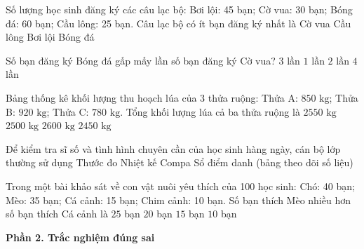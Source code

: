 \begin{ex} %
Số lượng học sinh đăng ký các câu lạc bộ: Bơi lội: 45 bạn; Cờ vua: 30 bạn; Bóng đá: 60 bạn; Cầu lông: 25 bạn. Câu lạc bộ có ít bạn đăng ký nhất là
\choice
{Cờ vua}
{\True Cầu lông}
{Bơi lội}
{Bóng đá}
\end{ex}

\begin{ex} %
Số bạn đăng ký Bóng đá gấp mấy lần số bạn đăng ký Cờ vua?
\choice
{$3$ lần}
{$1$ lần}
{\True $2$ lần}
{$4$ lần}
\end{ex}

\begin{ex} %
Bảng thống kê khối lượng thu hoạch lúa của 3 thửa ruộng: Thửa A: $850\text{ kg}$; Thửa B: $920\text{ kg}$; Thửa C: $780\text{ kg}$. Tổng khối lượng lúa cả ba thửa ruộng là
\choice
{\True $2550\text{ kg}$}
{$2500\text{ kg}$}
{$2600\text{ kg}$}
{$2450\text{ kg}$}
\end{ex}

\begin{ex} %
Để kiểm tra sĩ số và tình hình chuyên cần của học sinh hàng ngày, cán bộ lớp thường sử dụng
\choice
{Thước đo}
{Nhiệt kế}
{Compa}
{\True Sổ điểm danh (bảng theo dõi số liệu)}
\end{ex}

\begin{ex} %
Trong một bài khảo sát về con vật nuôi yêu thích của 100 học sinh: Chó: 40 bạn; Mèo: 35 bạn; Cá cảnh: 15 bạn; Chim cảnh: 10 bạn. Số bạn thích Mèo nhiều hơn số bạn thích Cá cảnh là
\choice
{$25$ bạn}
{\True $20$ bạn}
{$15$ bạn}
{$10$ bạn}
\end{ex}

\textbf{Phần 2. Trắc nghiệm đúng sai}

